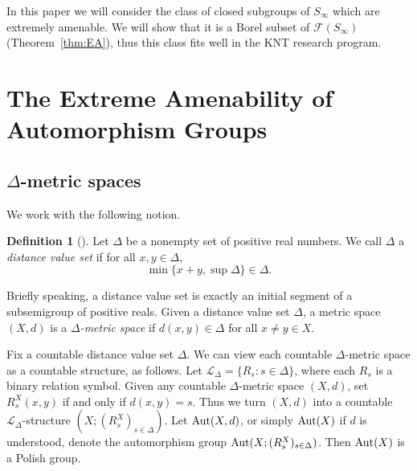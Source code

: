 \documentclass{amsart}
\theoremstyle{definition}
\newtheorem{definition}{Definition}[section]
\theoremstyle{remark}
\begin{document}
In this paper we will consider the class of closed subgroups of $S_\infty$ which are extremely amenable. We will show that it is a Borel subset of $\mathcal{F}(S_\infty)$ (Theorem~\ref{thm:EA}), thus this class fits well in the KNT research program.























\section{The Extreme Amenability of Automorphism Groups\label{sec:3}}

\subsection{$\Delta$-metric spaces}

 We work with the following notion. 

    \begin{definition}[\cite{EGLMM}]
        Let $\Delta$ be a nonempty set of positive real numbers. We call $\Delta$ a {\em distance value set} if for all $x, y\in \Delta$, 
        \begin{equation*}
           \min\{ x+y, \sup\Delta\} \in \Delta.
        \end{equation*}
    \end{definition}
Briefly speaking, a distance value set is exactly an initial segment of a subsemigroup of positive reals. Given a distance value set $\Delta$, a metric space $(X,d)$ is a {\em $\Delta$-metric space} if $d(x,y)\in\Delta$ for all $x\neq y\in X$. 

Fix a countable distance value set $\Delta$. We can view each countable $\Delta$-metric space as a countable structure, as follows. Let $\mathcal{L}_\Delta=\{R_s\colon s \in \Delta\}$, where each $R_s$ is a binary relation symbol. Given any countable $\Delta$-metric space $(X,d)$,  set $R^X_s(x,y)$ if and only if $d(x,y)=s$. Thus we turn $(X,d)$ into a countable $\mathcal{L}_\Delta$-structure $(X; (R^X_s)_{s\in \Delta})$. Let $\mbox{\rm Aut}(X,d)$, or simply $\mbox{\rm Aut}(X)$ if $d$ is understood, denote the automorphism group $\mbox{\rm Aut}(X; (R^X_s)_{s\in \Delta})$. Then $\mbox{\rm Aut}(X)$ is a Polish group. 
\end{document}
